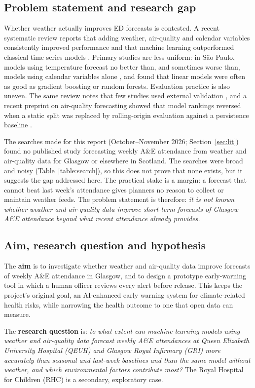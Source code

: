 \documentclass[12pt]{article}
\begin{document}
\subsection{Problem statement and research gap}
Whether weather actually improves ED forecasts is contested. A recent systematic review reports that adding weather, air-quality and calendar variables consistently improved performance and that machine learning outperformed classical time-series models \parencite{blanco2026}. Primary studies are less uniform: in S\~ao Paulo, models using temperature forecast no better than, and sometimes worse than, models using calendar variables alone \parencite{marcilio2013}, and \textcite{vollmer2021} found that linear models were often as good as gradient boosting or random forests. Evaluation practice is also uneven. The same review notes that few studies used external validation \parencite{blanco2026}, and a recent preprint on air-quality forecasting showed that model rankings reversed when a static split was replaced by rolling-origin evaluation against a persistence baseline \parencite{garciacrespi2026}.

The searches made for this report (October--November 2026; Section~\ref{sec:lit}) found no published study forecasting weekly A\&E attendance from weather and air-quality data for Glasgow or elsewhere in Scotland. The searches were broad and noisy (Table~\ref{table:search}), so this does not prove that none exists, but it suggests the gap addressed here. The practical stake is a margin: a forecast that cannot beat last week's attendance gives planners no reason to collect or maintain weather feeds. The problem statement is therefore: \emph{it is not known whether weather and air-quality data improve short-term forecasts of Glasgow A\&E attendance beyond what recent attendance already provides.}

\subsection{Aim, research question and hypothesis}\label{sec:aim}
The \textbf{aim} is to investigate whether weather and air-quality data improve forecasts of weekly A\&E attendance in Glasgow, and to design a prototype early-warning tool in which a human officer reviews every alert before release. This keeps the project's original goal, an AI-enhanced early warning system for climate-related health risks, while narrowing the health outcome to one that open data can measure.

The \textbf{research question} is: \emph{to what extent can machine-learning models using weather and air-quality data forecast weekly A\&E attendances at Queen Elizabeth University Hospital (QEUH) and Glasgow Royal Infirmary (GRI) more accurately than seasonal and last-week baselines and than the same model without weather, and which environmental factors contribute most?} The Royal Hospital for Children (RHC) is a secondary, exploratory case.
\end{document}
